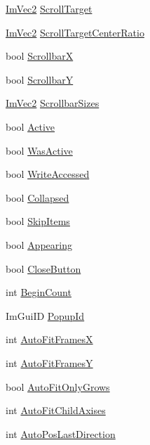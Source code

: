 \begin{DoxyCompactItemize}
\item 
\hyperlink{struct_im_vec2}{Im\+Vec2} \hyperlink{struct_im_gui_window_a77f86bed14712f73d9fb4b8ba2c4d040}{Scroll\+Target}
\item 
\hyperlink{struct_im_vec2}{Im\+Vec2} \hyperlink{struct_im_gui_window_a41f1fde48e59626ea1d19d098cd8ad84}{Scroll\+Target\+Center\+Ratio}
\item 
bool \hyperlink{struct_im_gui_window_a5aeada04ca67b0522677f5cdf5c6b483}{ScrollbarX}
\item 
bool \hyperlink{struct_im_gui_window_ae95f526590e0777de9cf26581a7d6702}{ScrollbarY}
\item 
\hyperlink{struct_im_vec2}{Im\+Vec2} \hyperlink{struct_im_gui_window_a040ebb8ac7de890df6cb6bfe048a72d5}{Scrollbar\+Sizes}
\item 
bool \hyperlink{struct_im_gui_window_a42f141fa0eed059176cb4360df1b1eb2}{Active}
\item 
bool \hyperlink{struct_im_gui_window_ab346ec3a2f305948af05ec1871610a8f}{Was\+Active}
\item 
bool \hyperlink{struct_im_gui_window_a3c29e870f485d115e7715e149c4dfc4d}{Write\+Accessed}
\item 
bool \hyperlink{struct_im_gui_window_a04e6b533b2401d1c7e78b47e31538e7b}{Collapsed}
\item 
bool \hyperlink{struct_im_gui_window_ac620c64ec2897561f719db266f5e9b05}{Skip\+Items}
\item 
bool \hyperlink{struct_im_gui_window_a158ebb04d20cac09504fdbc4994eb017}{Appearing}
\item 
bool \hyperlink{struct_im_gui_window_afef9f9e2a79626e28acd459e4cfe83e7}{Close\+Button}
\item 
int \hyperlink{struct_im_gui_window_aa27229a425dc17303be1cd8f4a61c17f}{Begin\+Count}
\item 
Im\+Gui\+ID \hyperlink{struct_im_gui_window_a319c5f43fa4ee9c76b8a6e551e0c0869}{Popup\+Id}
\item 
int \hyperlink{struct_im_gui_window_a4ec83127718940ff4e0e268dc45232cf}{Auto\+Fit\+FramesX}
\item 
int \hyperlink{struct_im_gui_window_a081b945f503a33c5fc686ff2ea9985f0}{Auto\+Fit\+FramesY}
\item 
bool \hyperlink{struct_im_gui_window_a3583d20a57fea8c8491f14f2dcda483c}{Auto\+Fit\+Only\+Grows}
\item 
int \hyperlink{struct_im_gui_window_ad323df685c026a4557912a5090414abe}{Auto\+Fit\+Child\+Axises}
\item 
int \hyperlink{struct_im_gui_window_ab057309fa22a6973a081448403a5baf4}{Auto\+Pos\+Last\+Direction}

\end{DoxyCompactItemize}
